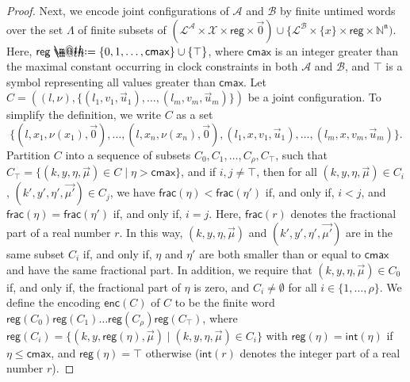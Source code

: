\documentclass{CSML}
\makeatletter
\theoremstyle{plain}\newtheorem{theorem}[thm]{Theorem}
\theoremstyle{plain}\newtheorem{corollary}[thm]{Corollary}
\theoremstyle{plain}\newtheorem{example}[thm]{Example}
\theoremstyle{plain}\newtheorem{lemma}[thm]{Lemma}
\theoremstyle{plain}\newtheorem{remark}[thm]{Remark}
\newcommand{\N}{\mathbb{N}}
\newcommand{\B}{\mathcal{B}}
\newcommand{\reg}{\mathsf{reg}}
\newcommand{\locs}{\mathcal{L}}
\newcommand{\clocks}{\mathcal{X}}
\newcommand{\loc}{\mathit{l}}
\newcommand{\cmax}{\mathsf{cmax}}
\renewcommand{\frac}{\mathsf{frac}}
\renewcommand{\int}{\mathsf{int}}
\newcommand{\enc}{\mathsf{enc}}
\newcommand{\A}{\mathcal{A}}
\newcommand*{\defeq}{\mathrel{\rlap{\raisebox{0.3ex}{$\m@th\cdot$}}\raisebox{-0.3ex}{$\m@th\cdot$}}=}
\makeatother
\begin{document}
\begin{proof}
		
		Next, we encode joint configurations of $\A$ and $\B$ by  finite untimed words over the set $\Lambda$ of finite subsets of $(\locs^\A \times \clocks\times \reg\times\vec{0}) \cup \{\locs^\B \times \{x\}\times \reg \times \N^{\mathfrak{n}})$.
		Here, 	
		$\reg\defeq \{0,1,\dots,\cmax\}\cup\{\top\}$, where $\cmax$ is an integer greater than the maximal constant occurring in clock constraints in both $\A$ and $\B$, and $\top$ is a symbol representing all values greater than $\cmax$. 
		Let $C=\left((\loc,\nu),\{(\loc_1,v_1,\vec{u}_1),\dots,(\loc_m,v_m,\vec{u}_m)\}\right)$
		be a joint configuration.		
		To simplify the definition, we write $C$ as a set 
		$$\{(\loc,x_1,\nu(x_1),\vec{0}),\dots,(\loc,x_n,\nu(x_n),\vec{0}),(\loc_1,x,v_1,\vec{u}_1),\dots,(\loc_m,x,v_m,\vec{u}_m)\}.$$
		Partition $C$ into a sequence of subsets 
		$C_0,C_1,\dots,C_\rho,C_\top$,
		such that $C_\top = \{(k,y,\eta,\vec{\mu})\in C\mid \eta>\cmax\}$, and
		if $i,j\neq\top$,
		then for all $(k,y,\eta,\vec{\mu})\in C_i$, $(k',y',\eta',\vec{\mu'})\in C_j$, 
		we have $\frac(\eta)<\frac(\eta')$ if, and only if, $i<j$, and 
		$\frac(\eta)=\frac(\eta')$ if, and only if, $i=j$. Here, $\frac(r)$ denotes the fractional part of a real number $r$. 		
		In this way,   $(k,y,\eta,\vec{\mu})$ and $(k',y',\eta',\vec{\mu'})$ are in the same subset $C_i$ if, and only if, $\eta$ and $\eta'$ are both smaller than or equal to $\cmax$ and have the same fractional part. 
		In addition, we require that 
		$(k,y,\eta,\vec{\mu})\in C_0$ if, and only if, the fractional part of $\eta$ is zero, and
		$C_i\neq\emptyset$ for all $i\in\{1,\dots,\rho\}$. 
		We define the encoding $\enc(C)$ of $C$ to be  the finite word 
		$\reg(C_0)\reg(C_1)\dots \reg(C_\rho)\reg(C_\top)$, 
		where $\reg(C_i)=\{(k,y,\reg(\eta),\vec{\mu})\mid (k,y,\eta,\vec{\mu})\in C_i\}$ with $\reg(\eta)=\int(\eta)$ if $\eta\leq\cmax$, and $\reg(\eta)=\top$ otherwise ($\int(r)$ denotes the integer part of a real number $r$). 
		

\end{proof}
\end{document}
